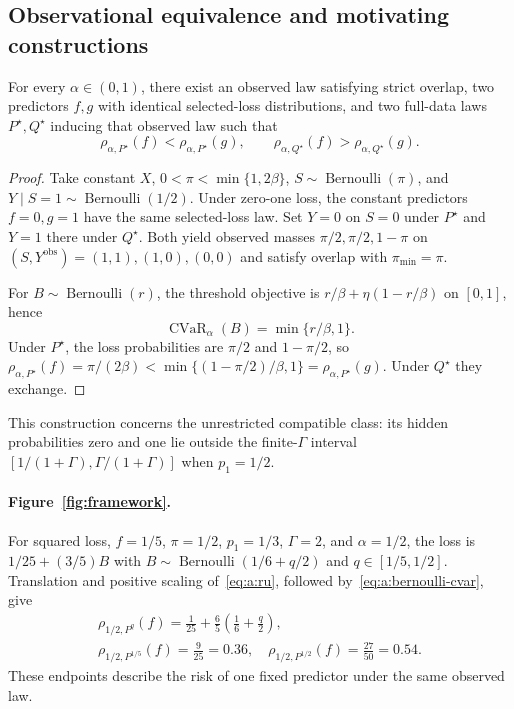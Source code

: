 \subsection{Observational equivalence and motivating constructions}
\label{app:examples}

\begin{theorem}
\label{thm:main:reversal}
For every $\alpha\in(0,1)$, there exist an observed law satisfying strict overlap, two predictors $f,g$ with identical selected-loss distributions, and two full-data laws $P^\star,Q^\star$ inducing that observed law such that
\[
\rho_{\alpha,P^\star}(f)<\rho_{\alpha,P^\star}(g),
\qquad
\rho_{\alpha,Q^\star}(f)>\rho_{\alpha,Q^\star}(g).
\]
\end{theorem}

\begin{proof}
Take constant $X$, $0<\pi<\min\{1,2\beta\}$, $S\sim\operatorname{Bernoulli}(\pi)$, and $Y\mid S=1\sim\operatorname{Bernoulli}(1/2)$. Under zero-one loss, the constant predictors $f=0,g=1$ have the same selected-loss law. Set $Y=0$ on $S=0$ under $P^\star$ and $Y=1$ there under $Q^\star$. Both yield observed masses $\pi/2,\pi/2,1-\pi$ on $(S,Y^{\mathrm{obs}})=(1,1),(1,0),(0,0)$ and satisfy overlap with $\pi_{\min}=\pi$.

For $B\sim\operatorname{Bernoulli}(r)$, the threshold objective is $r/\beta+\eta(1-r/\beta)$ on $[0,1]$, hence
\begin{equation}
\operatorname{CVaR}_\alpha(B)=\min\{r/\beta,1\}.
\label{eq:a:bernoulli-cvar}
\end{equation}
Under $P^\star$, the loss probabilities are $\pi/2$ and $1-\pi/2$, so $\rho_{\alpha,P^\star}(f)=\pi/(2\beta)<\min\{(1-\pi/2)/\beta,1\}=\rho_{\alpha,P^\star}(g)$. Under $Q^\star$ they exchange.
\end{proof}
This construction concerns the unrestricted compatible class: its hidden probabilities zero and one lie outside the finite-$\Gamma$ interval $[1/(1+\Gamma),\Gamma/(1+\Gamma)]$ when $p_1=1/2$.

\paragraph{Figure~\ref{fig:framework}.}
For squared loss, $f=1/5$, $\pi=1/2$, $p_1=1/3$, $\Gamma=2$, and $\alpha=1/2$, the loss is $1/25+(3/5)B$ with $B\sim\operatorname{Bernoulli}(1/6+q/2)$ and $q\in[1/5,1/2]$. Translation and positive scaling of~\eqref{eq:a:ru}, followed by~\eqref{eq:a:bernoulli-cvar}, give
\begin{equation}
\begin{gathered}
\rho_{1/2,P^q}(f)=\frac1{25}+\frac65\left(\frac16+\frac q2\right),\\
\rho_{1/2,P^{1/5}}(f)=\frac9{25}=0.36,\quad
\rho_{1/2,P^{1/2}}(f)=\frac{27}{50}=0.54.
\end{gathered}
\label{eq:a:figure-one}
\end{equation}
These endpoints describe the risk of one fixed predictor under the same observed law.


